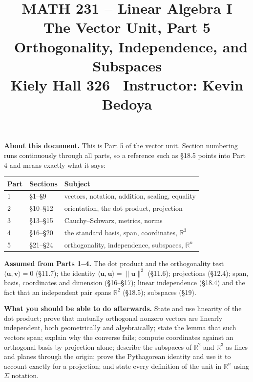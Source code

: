 \documentclass[11pt]{article}
\title{\vspace{-1.2cm}\textbf{\sffamily MATH 231 -- Linear Algebra I}\\[4pt]
       {\large\sffamily The Vector Unit, Part 5 \textbullet\ Orthogonality,
        Independence, and Subspaces}\\[2pt]
       {\normalsize\sffamily Kiely Hall 326 \textbullet\
        Instructor: Kevin Bedoya}}
\author{}
\date{}
\theoremstyle{definition}
\theoremstyle{remark}
\newcommand{\R}{\mathbb{R}}
\newcommand{\vc}[1]{\mathbf{#1}}
\newcommand{\norm}[1]{\lVert #1\rVert}
\begin{document}
\setcounter{section}{20}  %
\maketitle
\vspace{-1.6cm}

\noindent\textbf{About this document.} This is Part 5 of the vector unit.
Section numbering runs continuously through all parts, so a reference such as
\S18.5 points into Part 4 and means exactly what it says:

\begin{center}
\renewcommand{\arraystretch}{1.2}
\begin{tabular}{@{}l l l@{}}
\toprule
\textbf{Part} & \textbf{Sections} & \textbf{Subject} \\
\midrule
1 & \S1--\S9    & vectors, notation, addition, scaling, equality \\
2 & \S10--\S12  & orientation, the dot product, projection \\
3 & \S13--\S15  & Cauchy--Schwarz, metrics, norms \\
4 & \S16--\S20  & the standard basis, span, coordinates, $\R^{3}$ \\
5 & \S21--\S24  & orthogonality, independence, subspaces, $\R^{n}$ \\
\bottomrule
\end{tabular}
\end{center}

\noindent\textbf{Assumed from Parts 1--4.} The dot product and the
orthogonality test $\langle\vc{u},\vc{v}\rangle=0$ (\S11.7); the identity
$\langle\vc{u},\vc{u}\rangle=\norm{\vc{u}}^{2}$ (\S11.6); projections (\S12.4);
span, basis, coordinates and dimension (\S16--\S17); linear independence
(\S18.4) and the fact that an independent pair spans $\R^{2}$ (\S18.5);
subspaces (\S19).

\medskip
\noindent\textbf{What you should be able to do afterwards.} State and use
linearity of the dot product; prove that mutually orthogonal nonzero vectors are
linearly independent, both geometrically and algebraically; state the lemma that
such vectors span; explain why the converse fails; compute coordinates against
an orthogonal basis by projection alone; describe the subspaces of $\R^{2}$
and $\R^{3}$ as lines and planes through the origin; prove the Pythagorean
identity and use it to account exactly for a projection; and state every
definition of the unit in $\R^{n}$ using $\Sigma$ notation.
\end{document}
